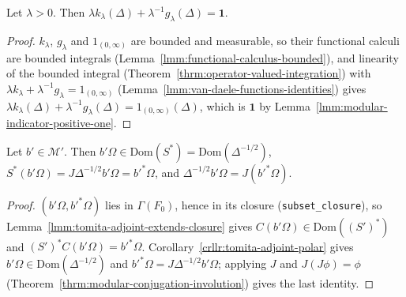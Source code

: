 \begin{lemma}[$\lambda k_\lambda(\Delta) + \lambda^{-1}g_\lambda(\Delta) = \mathbf{1}$]
    \label{lmm:van-daele-partition-of-unity}
    \leanok
    Let $\lambda > 0$. Then $\lambda k_\lambda(\Delta) + \lambda^{-1}g_\lambda(\Delta) = \mathbf{1}$.
\end{lemma}
\begin{proof}
    \leanok
    $k_\lambda$, $g_\lambda$ and $1_{(0, \infty)}$ are bounded and measurable, so their functional calculi are bounded integrals (Lemma~\ref{lmm:functional-calculus-bounded}), and linearity of the bounded integral (Theorem~\ref{thrm:operator-valued-integration}) with $\lambda k_\lambda + \lambda^{-1}g_\lambda = 1_{(0, \infty)}$ (Lemma~\ref{lmm:van-daele-functions-identities}) gives $\lambda k_\lambda(\Delta) + \lambda^{-1}g_\lambda(\Delta) = 1_{(0, \infty)}(\Delta)$, which is $\mathbf{1}$ by Lemma~\ref{lmm:modular-indicator-positive-one}.
\end{proof}

\begin{lemma}
    \label{lmm:tomita-adjoint-on-commutant}
    \leanok
    Let $b' \in \mathcal{M}'$. Then $b'\Omega \in \text{Dom}(S^*) = \text{Dom}(\Delta^{-1/2})$, $S^*(b'\Omega) = J\Delta^{-1/2}b'\Omega = b'^*\Omega$, and $\Delta^{-1/2}b'\Omega = J(b'^*\Omega)$.
\end{lemma}
\begin{proof}
    \leanok
    $(b'\Omega, b'^*\Omega)$ lies in $\Gamma(F_0)$, hence in its closure (\texttt{subset\_closure}), so Lemma~\ref{lmm:tomita-adjoint-extends-closure} gives $C(b'\Omega) \in \text{Dom}((S')^*)$ and $(S')^*C(b'\Omega) = b'^*\Omega$. Corollary~\ref{crllr:tomita-adjoint-polar} gives $b'\Omega \in \text{Dom}(\Delta^{-1/2})$ and $b'^*\Omega = J\Delta^{-1/2}b'\Omega$; applying $J$ and $J(J\phi) = \phi$ (Theorem~\ref{thrm:modular-conjugation-involution}) gives the last identity.
\end{proof}

